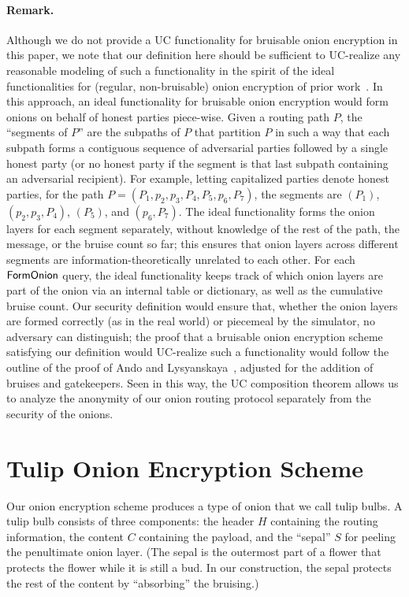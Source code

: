 \documentclass[runningheads,a4paper]{llncs}
\begin{document}
\paragraph{Remark.}  Although we do not provide a UC functionality for bruisable onion encryption in this paper, we note that our definition here should be sufficient to UC-realize any reasonable modeling of such a functionality in the spirit of the ideal functionalities for (regular, non-bruisable) onion encryption of prior work~\cite{C:CamLys05,TCC:AndLys21}.  
In this approach, an ideal functionality for bruisable onion encryption would form onions on behalf of honest parties piece-wise. Given a routing path $P$, the ``segments of $P$'' are the subpaths of $P$ that partition $P$ in such a way that each subpath forms a contiguous sequence of adversarial parties followed by a single honest party (or no honest party if the segment is that last subpath containing an adversarial recipient). For example, letting capitalized parties denote honest parties, for the path $P = (P_1, p_2, p_3, P_4, P_5, p_6, P_7)$, the segments are $(P_1)$, $(p_2, p_3, P_4)$, $(P_5)$, and $(p_6, P_7)$. The ideal functionality forms the onion layers for each segment separately, without knowledge of the rest of the path, the message, or the bruise count so far; this ensures that onion layers across different segments are information-theoretically unrelated to each other. For each $\mathsf{FormOnion}$ query, the ideal functionality keeps track of which onion layers are part of the onion via an internal table or dictionary, as well as the cumulative bruise count. Our security definition would ensure that, whether the onion layers are formed correctly (as in the real world) or piecemeal by the simulator, no adversary can distinguish; the proof that a bruisable onion encryption scheme satisfying our definition would UC-realize such a functionality would follow the outline of the proof of Ando and Lysyanskaya~\cite{TCC:AndLys21}, adjusted for the addition of bruises and gatekeepers.  Seen in this way, the UC composition theorem allows us to analyze the anonymity of our onion routing protocol separately from the security of the onions.




\section{Tulip Onion Encryption Scheme} \label{sec:boes}
Our onion encryption scheme produces a type of onion that we call tulip bulbs. A tulip bulb consists of three components: the header $H$ containing the routing information, the content $C$ containing the payload, and the ``sepal'' $S$ for peeling the penultimate onion layer. (The sepal is the outermost part of a flower that protects the flower while it is still a bud. In our construction, the sepal protects the rest of the content by ``absorbing'' the bruising.)
\end{document}
